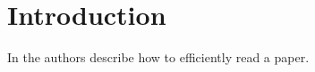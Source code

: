 \section{Introduction}
\label{section:intro}

In \cite{Keshav2007} the authors describe how to efficiently read a paper.
%
\lipsum
